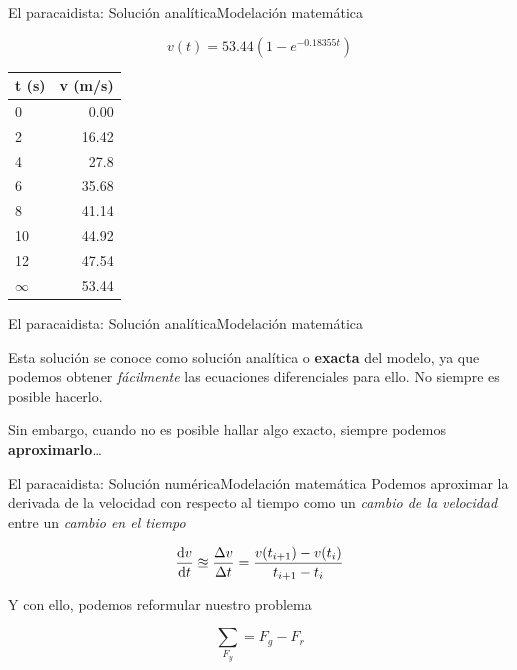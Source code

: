 \documentclass[spanish, c]{beamer}
\begin{document}
\begin{frame}{El paracaidista: Solución analítica}{Modelación matemática}

    $$v(t) = 53.44(1 - e^{-0.18355t})$$

    \bigskip
    
    \begin{table}[H]
        \begin{tabular}{@{}lr@{}}
        \toprule
        \textbf{t (s)} & \textbf{v (m/s)} \\ \midrule
        0              & 0.00             \\
        2              & 16.42            \\
        4              & 27.8             \\
        6              & 35.68            \\
        8              & 41.14            \\
        10             & 44.92            \\
        12             & 47.54            \\
        $\infty$       & 53.44            \\ \bottomrule
        \end{tabular}
        \end{table}
\end{frame}

\begin{frame}{El paracaidista: Solución analítica}{Modelación matemática}

    Esta solución se conoce como \alert{solución analítica} o \textbf{exacta} del modelo, ya que podemos obtener \textit{fácilmente} las ecuaciones diferenciales para ello. No siempre es posible hacerlo.

    \bigskip

    Sin embargo, cuando no es posible hallar algo exacto, siempre podemos \textbf{aproximarlo}\dots

\end{frame}

\begin{frame}{El paracaidista: Solución numérica}{Modelación matemática}
    Podemos aproximar la derivada de la velocidad con respecto al tiempo como un \textit{cambio de la velocidad} entre un \textit{cambio en el tiempo}

    \bigskip

    $$\dv{v}{t} \approxeq \frac{\Delta v}{\Delta t} = \frac{v(t_{i+1}) - v(t_i)}{t_{i+1} - t_i}$$

    \bigskip

    Y con ello, podemos reformular nuestro problema

    $$\sum_{F_y} = F_g - F_r$$
\end{frame}
\end{document}
